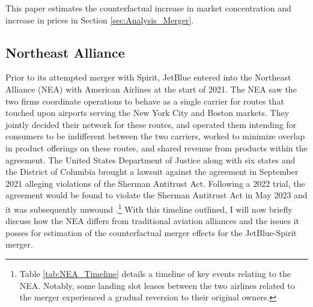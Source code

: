 \documentclass{article}
\begin{document}
    This paper estimates the counterfactual increase in market concentration and increase in prices in Section \ref{sec:Analysis_Merger}. 

    	
	\subsection{Northeast Alliance}
	\label{sec:Setting_NEA}
	
	Prior to its attempted merger with Spirit, JetBlue entered into the Northeast Alliance (NEA) with American Airlines at the start of 2021. The NEA saw the two firms coordinate operations to behave as a single carrier for routes that touched upon airports serving the New York City and Boston markets. They jointly decided their network for these routes, and operated them intending for consumers to be indifferent between the two carriers, worked to minimize overlap in product offerings on these routes, and shared revenue from products within the agreement. The United States Department of Justice along with six states and the District of Columbia brought a lawsuit against the agreement in September 2021 alleging violations of the Sherman Antitrust Act. Following a 2022 trial, the agreement would be found to violate the Sherman Antitrust Act in May 2023 and it was subsequently unwound \citep{rennison_jetblue-american_2023, rains_what_2023}.\footnote{Table \ref{tab:NEA_Timeline} details a timeline of key events relating to the NEA. Notably, some landing slot leases between the two airlines related to the merger experienced a gradual reversion to their original owners.} With this timeline outlined, I will now briefly discuss how the NEA differs from traditional aviation alliances and the issues it posses for estimation of the counterfactual merger effects for the JetBlue-Spirit merger. 
\end{document}
